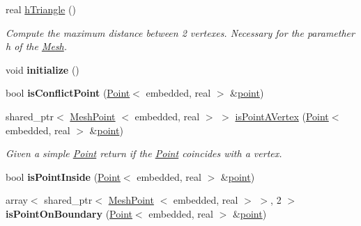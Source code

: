 \begin{DoxyCompactItemize}
\item 
\hypertarget{class_polygon_a96f0c55cdb99e0cfc87ecf4d855c91d3}{real \hyperlink{class_polygon_a96f0c55cdb99e0cfc87ecf4d855c91d3}{h\-Triangle} ()}\label{class_polygon_a96f0c55cdb99e0cfc87ecf4d855c91d3}

\begin{DoxyCompactList}\small\item\em \-Compute the maximum distance between 2 vertexes. \-Necessary for the paramether h of the \hyperlink{class_mesh}{\-Mesh}. \end{DoxyCompactList}\item 
\hypertarget{class_polygon_a3d0aa945fd528d2c6ee44838f9eaad6f}{void {\bfseries initialize} ()}\label{class_polygon_a3d0aa945fd528d2c6ee44838f9eaad6f}

\item 
\hypertarget{class_polygon_a4df44a07db58dba116ae2362fb08e9aa}{bool {\bfseries is\-Conflict\-Point} (\hyperlink{class_point}{\-Point}$<$ embedded, real $>$ \&\hyperlink{class_polygon_a56f83109c9c8ad214f41bd8036efb32c}{point})}\label{class_polygon_a4df44a07db58dba116ae2362fb08e9aa}

\item 
\hypertarget{class_polygon_a10ed15053764f6170fee5b4f06a76174}{shared\-\_\-ptr$<$ \hyperlink{class_mesh_point}{\-Mesh\-Point}\*
$<$ embedded, real $>$ $>$ \hyperlink{class_polygon_a10ed15053764f6170fee5b4f06a76174}{is\-Point\-A\-Vertex} (\hyperlink{class_point}{\-Point}$<$ embedded, real $>$ \&\hyperlink{class_polygon_a56f83109c9c8ad214f41bd8036efb32c}{point})}\label{class_polygon_a10ed15053764f6170fee5b4f06a76174}

\begin{DoxyCompactList}\small\item\em \-Given a simple \hyperlink{class_point}{\-Point} return if the \hyperlink{class_point}{\-Point} coincides with a vertex. \end{DoxyCompactList}\item 
\hypertarget{class_polygon_a36fa14ce6d01941d406a04c795c2742d}{bool {\bfseries is\-Point\-Inside} (\hyperlink{class_point}{\-Point}$<$ embedded, real $>$ \&\hyperlink{class_polygon_a56f83109c9c8ad214f41bd8036efb32c}{point})}\label{class_polygon_a36fa14ce6d01941d406a04c795c2742d}

\item 
\hypertarget{class_polygon_a6462af95446a3bd604146e10ff358860}{array$<$ shared\-\_\-ptr$<$ \hyperlink{class_mesh_point}{\-Mesh\-Point}\*
$<$ embedded, real $>$ $>$, 2 $>$ {\bfseries is\-Point\-On\-Boundary} (\hyperlink{class_point}{\-Point}$<$ embedded, real $>$ \&\hyperlink{class_polygon_a56f83109c9c8ad214f41bd8036efb32c}{point})}\label{class_polygon_a6462af95446a3bd604146e10ff358860}


\end{DoxyCompactItemize}
